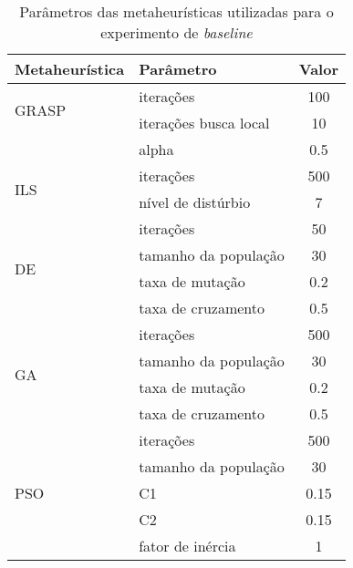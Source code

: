\begin{table}[ht!]
    \centering
    \caption{Parâmetros das metaheurísticas utilizadas para o experimento de \textit{baseline}}
    \begin{tabular}{llc}
        \toprule
         \textbf{Metaheurística} & \textbf{Parâmetro} & \textbf{Valor} \\
         \midrule
         \multirow{2}{*}{GRASP} & iterações                 & 100\\
                                & iterações busca local     & 10\\
                                & alpha                     & 0.5\\
         \midrule
         \multirow{2}{*}{ILS}    & iterações                 & 500\\
                                & nível de distúrbio        & 7\\
         \midrule
         \multirow{4}{*}{DE}    & iterações                 & 50\\
                                & tamanho da população      & 30\\
                                & taxa de mutação           & 0.2\\
                                & taxa de cruzamento        & 0.5\\
        \midrule
        \multirow{4}{*}{GA}     & iterações                 & 500\\
                                & tamanho da população      & 30\\
                                & taxa de mutação           & 0.2\\
                                & taxa de cruzamento        & 0.5\\
        \midrule
        \multirow{5}{*}{PSO}    & iterações                 & 500\\
                                & tamanho da população      & 30\\
                                & C1                        & 0.15\\
                                & C2                        & 0.15\\
                                & fator de inércia          & 1\\
        \bottomrule
    \end{tabular}
    \label{tab:configExpBaseline}
\end{table}

